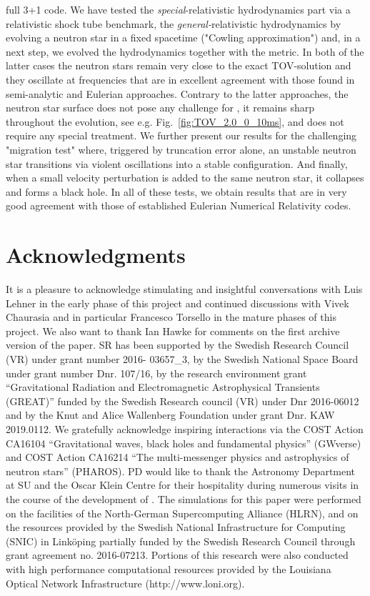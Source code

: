 \documentclass[useAMS,usenatbib]{iopart}
\begin{document}
full 3+1 code. We have tested the {\em special}-relativistic hydrodynamics part via a relativistic
shock tube benchmark, the {\em general-}relativistic hydrodynamics  by evolving a neutron star
in a fixed spacetime ("Cowling approximation") and, in a next step, we evolved the
hydrodynamics together with the metric. 
In both of the latter cases the neutron stars remain very close
to the exact TOV-solution and they oscillate at frequencies that are in excellent agreement
with those found in semi-analytic and Eulerian approaches. Contrary to the latter approaches,
the neutron star surface does not pose any challenge for \spB, it remains sharp throughout the
evolution, see e.g. Fig.~\ref{fig:TOV_2.0_0_10ms}, and does not require any special treatment. 
We further present our results for the challenging "migration test" where, triggered by truncation 
error alone, an unstable neutron star transitions via violent oscillations into a stable configuration. 
And finally, when a small velocity perturbation is added to the same neutron star, it collapses and forms
a black hole. In all of these tests, we obtain results that are in very good agreement with those of
established Eulerian Numerical Relativity codes.


\section*{Acknowledgments}

It is a pleasure to acknowledge stimulating and insightful conversations with Luis Lehner
in the early phase of this project and continued discussions with Vivek Chaurasia and 
in particular Francesco Torsello in the mature phases of this project. We also want to thank
Ian Hawke for comments on the first archive version of the paper.  SR has been 
supported by the Swedish Research Council (VR) under grant number 2016- 03657\_3, by 
the Swedish National Space Board under grant number  Dnr. 107/16,  by the 
research environment grant ``Gravitational Radiation and Electromagnetic Astrophysical
Transients (GREAT)'' funded by the Swedish Research 
council (VR) under Dnr 2016-06012 and by the Knut and Alice Wallenberg Foundation
under grant Dnr. KAW 2019.0112. We gratefully 
acknowledge inspiring interactions via the COST Action CA16104 
``Gravitational waves, black holes and fundamental physics'' (GWverse) and  COST Action CA16214
``The multi-messenger physics and astrophysics of neutron stars'' (PHAROS).
PD would like to thank the Astronomy Department at SU and the Oscar Klein Centre for their hospitality during
numerous visits in the course of the development of \spB.
The simulations for this paper were performed on the facilities of the North-German Supercomputing Alliance (HLRN),
and on the resources provided by the Swedish National Infrastructure for Computing (SNIC) 
in Link\"oping  partially funded by the Swedish Research Council through grant agreement no. 2016-07213. 
Portions of this research were also conducted with high
performance computational resources provided by the Louisiana Optical Network
Infrastructure (http://www.loni.org).
 \\
 
\end{document}
